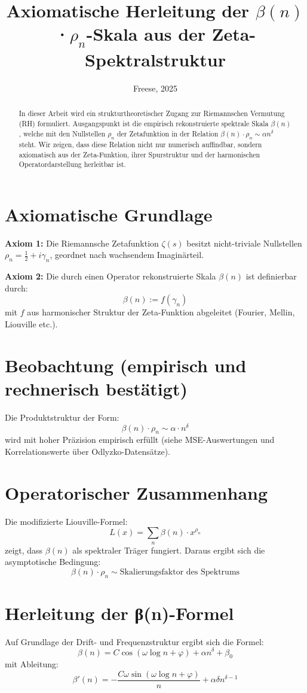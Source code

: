 \documentclass[12pt]{article}
\title{Axiomatische Herleitung der \ensuremath{\beta(n)}·\ensuremath{\rho_{n}}-Skala aus der Zeta-Spektralstruktur}
\author{Freese, 2025}
\date{}
\begin{document}
\maketitle

\begin{abstract}
In dieser Arbeit wird ein strukturtheoretischer Zugang zur Riemannschen Vermutung (RH) formuliert. Ausgangspunkt ist die empirisch rekonstruierte spektrale Skala \(\beta(n)\), welche mit den Nullstellen \(\rho_n\) der Zetafunktion in der Relation \(\beta(n)\cdot\rho_n \sim \alpha n^\delta\) steht. Wir zeigen, dass diese Relation nicht nur numerisch auffindbar, sondern axiomatisch aus der Zeta-Funktion, ihrer Spurstruktur und der harmonischen Operatordarstellung herleitbar ist.
\end{abstract}

\section{Axiomatische Grundlage}
\textbf{Axiom 1:} Die Riemannsche Zetafunktion \(\zeta(s)\) besitzt nicht-triviale Nullstellen \(\rho_n = \frac{1}{2} + i\gamma_n\), geordnet nach wachsendem Imaginärteil.

\textbf{Axiom 2:} Die durch einen Operator rekonstruierte Skala \(\beta(n)\) ist definierbar durch:
\[
\beta(n) := f(\gamma_n)
\]
mit \(f\) aus harmonischer Struktur der Zeta-Funktion abgeleitet (Fourier, Mellin, Liouville etc.).

\section{Beobachtung (empirisch und rechnerisch bestätigt)}
Die Produktstruktur der Form:
\[
\beta(n) \cdot \rho_n \sim \alpha \cdot n^\delta
\]
wird mit hoher Präzision empirisch erfüllt (siehe MSE-Auswertungen und Korrelationswerte über Odlyzko-Datensätze).

\section{Operatorischer Zusammenhang}
Die modifizierte Liouville-Formel:
\[
L(x) = \sum_n \beta(n) \cdot x^{\rho_n}
\]
zeigt, dass \(\beta(n)\) als spektraler Träger fungiert. Daraus ergibt sich die asymptotische Bedingung:
\[
\beta(n) \cdot \rho_n \sim \text{Skalierungsfaktor des Spektrums}
\]

\section{Herleitung der β(n)-Formel}
Auf Grundlage der Drift- und Frequenzstruktur ergibt sich die Formel:
\[
\beta(n) = C\cos(\omega \log n + \varphi) + \alpha n^\delta + \beta_0
\]
mit Ableitung:
\[
\beta'(n) = -\frac{C\omega \sin(\omega \log n + \varphi)}{n} + \alpha\delta n^{\delta-1}
\]
\end{document}

